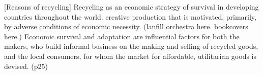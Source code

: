 [Reasons of recycling]  Recycling as an economic strategy of survival in developing countries throughout the world. creative production that is motivated, primarily, by adverse conditions of economic necessity. (lanfill orchestra here. bookcovers here.) Economic survival and adaptation are influential factors for both the makers, who build informal business on the making and selling of recycled goods, and the local consumers, for whom the market for affordable, utilitarian goods is devised. (p25)



